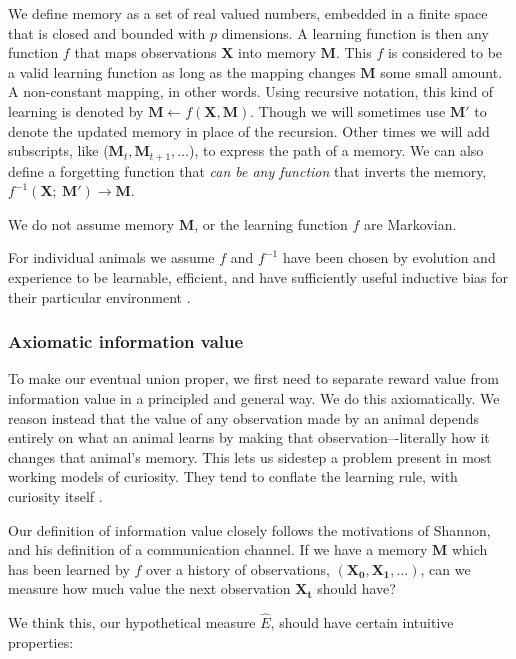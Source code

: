 We define memory as a set of real valued numbers, embedded in a finite space that is closed and bounded with $p$ dimensions. A learning function is then any function $f$ that maps observations $\mathbf{X}$ into memory $\mathbf{M}$. This $f$ is considered to be a valid learning function as long as the mapping changes $\mathbf{M}$ some small amount. A non-constant mapping, in other words. Using recursive notation, this kind of learning is denoted by $\mathbf{M} \leftarrow f(\mathbf{X},\mathbf{M}) $. Though we will sometimes use $\mathbf{M'}$ to denote the updated memory in place of the recursion. Other times we will add subscripts, like ($\mathbf{M}_t,\mathbf{M}_{t+1},\ldots$), to express the path of a memory. We can also define a forgetting function that \textit{can be any function} that inverts the memory, $f^{-1}(\mathbf{X};\ \mathbf{M}') \rightarrow \mathbf{M}$. 

We do not assume memory $\mathbf{M}$, or the learning function $f$ are Markovian.

For individual animals we assume $f$ and $f^{-1}$ have been chosen by evolution and experience to be learnable, efficient, and have sufficiently useful inductive bias for their particular environment \cite{Valiant1984a,Thrun1992a}. 


\subsubsection*{Axiomatic information value} 
To make our eventual union proper, we first need to separate reward value from information value in a principled and general way. We do this axiomatically.
We reason instead that the value of any observation made by an animal depends entirely on what an animal learns by making that observation–-literally how it changes that animal's memory. This lets us sidestep a problem present in most working models of curiosity. They tend to conflate the learning rule, with curiosity itself \cite{Schmidhuber1991b,Oudeyer2018a,Burda2018,Zhang2013,deAbril2018,Zhou2020,Schwartenbeck2019,Wilson2014a,Lehman2011,Velez2014}.

Our definition of information value closely follows the motivations of Shannon, and his definition of a communication channel. If we have a memory $\mathbf{M}$ which has been learned by $f$ over a history of observations, $(\mathbf{X_0},\mathbf{X_1},...)$, can we measure how much value the next observation $\mathbf{X_t}$ should have? 

We think this, our hypothetical measure $\hat E$, should have certain intuitive properties:

